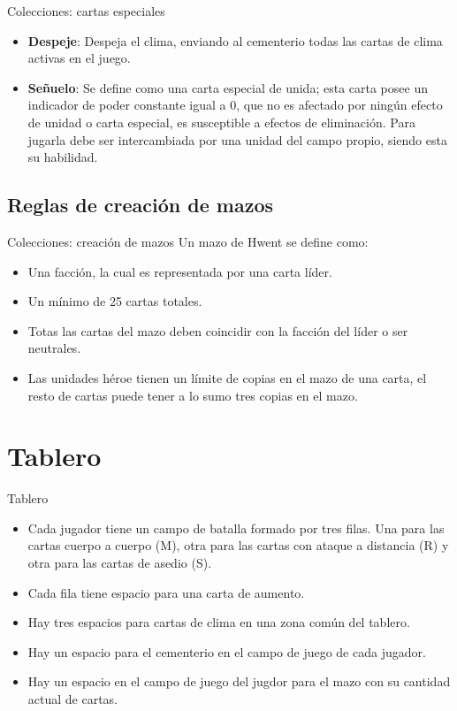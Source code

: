 \documentclass[a4paper, 12pt]{beamer}
\begin{document}
\begin{frame}{\textcolor{plata}{Colecciones: cartas especiales}}
\begin{itemize}
\item \textbf{Despeje}: Despeja el clima, enviando al cementerio todas las cartas de clima activas en el juego.
\item \textbf{Señuelo}: Se define como una carta especial de unida; esta carta posee un indicador de poder constante igual a 0, que no es afectado por ningún efecto de unidad o carta especial, es susceptible a efectos de eliminación. Para jugarla debe ser intercambiada por una unidad del campo propio, siendo esta su habilidad.
\end{itemize}
\end{frame}

\subsection{Reglas de creación de mazos}
\begin{frame}{\textcolor{plata}{Colecciones: creación de mazos}}
Un mazo de Hwent se define como:
\begin{itemize}
\item Una facción, la cual es representada por una carta líder.
\item Un mínimo de 25 cartas totales.
\item Totas las cartas del mazo deben coincidir con la facción del líder o ser neutrales.
\item Las unidades héroe tienen un límite de copias en el mazo de una carta, el resto de cartas puede tener a lo sumo tres copias en el mazo.
\end{itemize}
\end{frame}

\section{Tablero}
\begin{frame}{\textcolor{plata}{Tablero}}
\begin{itemize}
\item Cada jugador tiene un campo de batalla formado por tres filas. Una
para las cartas cuerpo a cuerpo (M), otra para las cartas con ataque a
distancia (R) y otra para las cartas de asedio (S).
\item Cada fila tiene espacio para una carta de aumento.
\item Hay tres espacios para cartas de clima en una zona común del tablero.
\item Hay un espacio para el cementerio en el campo de juego de cada jugador.
\item Hay un espacio en el campo de juego del jugdor para el mazo con su cantidad actual de cartas.
\end{itemize}
\end{frame}
\end{document}
